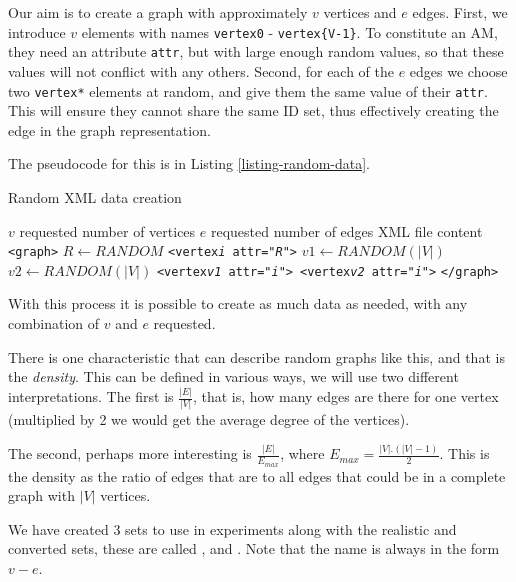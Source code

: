Our aim is to create a graph with approximately $v$ vertices and $e$ edges. First, we introduce $v$ elements with names \texttt{vertex0} - \texttt{vertex\{V-1\}}. To constitute an AM, they need an attribute \texttt{attr}, but with large enough random values, so that these values will not conflict with any others. Second, for each of the $e$ edges we choose two \texttt{vertex*} elements at random, and give them the same value of their \texttt{attr}. This will ensure they cannot share the same ID set, thus effectively creating the edge in the graph representation.

The pseudocode for this is in Listing \ref{listing-random-data}.

\begin{algorithm}
\caption{Random XML data creation}
\label{listing-random-data}
\begin{algorithmic}
\REQUIRE $v$ requested number of vertices
\REQUIRE $e$ requested number of edges
\ENSURE XML file content
\PRINT \texttt{<graph>}
	\STATE $R \gets RANDOM$
	\PRINT \texttt{<vertex\textit{i} attr="\textit{R}">}
\ENDFOR
{}
	\STATE $v1 \gets RANDOM(|V|)$
	\STATE $v2 \gets RANDOM(|V|)$
	\PRINT \texttt{<vertex\textit{v1} attr="\textit{i}"> <vertex\textit{v2} attr="\textit{i}">}
\ENDFOR
\PRINT \texttt{</graph>}
\RETURN
\end{algorithmic}
\end{algorithm}

With this process it is possible to create as much data as needed, with any combination of $v$ and $e$ requested.

There is one characteristic that can describe random graphs like this, and that is the \textit{density}. This can be defined in various ways, we will use two different interpretations. The first is $\frac{|E|}{|V|}$, that is, how many edges are there for one vertex (multiplied by 2 we would get the average degree of the vertices).

The second, perhaps more interesting is $\frac{|E|}{E_{max}}$, where $E_{max} = \frac{|V|.(|V|-1)}{2}$. This is the density as the ratio of edges that are to all edges that could be in a complete graph with $|V|$ vertices.

We have created 3 sets to use in experiments along with the realistic and converted sets, these are called ,  and . Note that the name is always in the form $v-e$.\\

